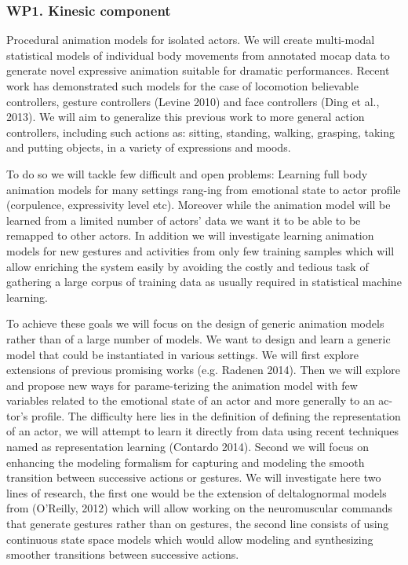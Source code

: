 
\subsubsection{WP1. Kinesic component} 

Procedural animation models for isolated actors. We will create multi-modal statistical models of individual body movements from annotated mocap data to generate novel expressive animation suitable for  dramatic performances. Recent work has demonstrated such models for the case of locomotion believable controllers, gesture controllers (Levine 2010) and face controllers (Ding et al., 2013). We will aim to generalize this previous work to more general action controllers, including such actions as: sitting, standing, walking, grasping, taking and putting objects, in a variety of expressions and moods. 

To do so we will tackle few difficult and open problems: Learning full body animation models for many settings rang-ing from emotional state to actor profile (corpulence, expressivity level etc). Moreover while the animation model will be learned from a limited number of actors' data we want it to be able to be remapped to other actors. In addition we will investigate learning animation models for new gestures and activities from only few training samples which will allow enriching the system easily by avoiding the costly and tedious task of gathering a large corpus of training data as usually required in statistical machine learning.

To achieve these goals we will focus on the design of generic animation models rather than of a large number of models. We want to design and learn a generic model that could be instantiated in various settings. We will first explore extensions of previous promising works (e.g. Radenen 2014). Then we will explore and propose new ways for parame-terizing the animation model with few variables related to the emotional state of an actor and more generally to an ac-tor's profile. The difficulty here lies in the definition of defining the representation of an actor, we will attempt to learn it directly from data using recent techniques named as representation learning (Contardo 2014). Second we will focus on enhancing the modeling formalism for capturing and modeling the smooth transition between successive actions or gestures. We will investigate here two lines of research, the first one would be the extension of deltalognormal models from (O'Reilly, 2012) which will allow working on the neuromuscular commands 
that generate gestures rather than on gestures, the second line consists of using continuous state space models which would allow modeling and synthesizing smoother transitions between successive actions.

